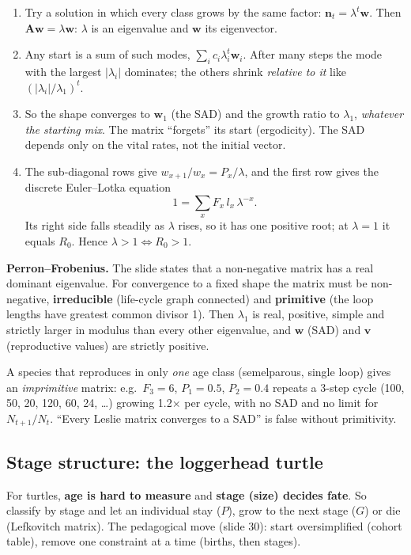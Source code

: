 \begin{chain}
\begin{enumerate}
\item Try a solution in which every class grows by the same factor: $\mathbf n_t=\lambda^t\mathbf w$. Then
$\mathbf A\mathbf w=\lambda\mathbf w$: $\lambda$ is an eigenvalue and $\mathbf w$ its eigenvector.
\item Any start is a sum of such modes, $\sum_i c_i\lambda_i^t\mathbf w_i$. After many steps the mode with the
largest $|\lambda_i|$ dominates; the others shrink \emph{relative to it} like $(|\lambda_i|/\lambda_1)^t$.
\item So the shape converges to $\mathbf w_1$ (the SAD) and the growth ratio to $\lambda_1$, \emph{whatever the
starting mix}. The matrix ``forgets'' its start (ergodicity). The SAD depends only on the vital rates, not the initial
vector.
\item The sub-diagonal rows give $w_{x+1}/w_x=P_x/\lambda$, and the first row gives the discrete Euler--Lotka equation
\[
1=\sum_x F_x\,l_x\,\lambda^{-x}.
\]
Its right side falls steadily as $\lambda$ rises, so it has one positive root; at $\lambda=1$ it equals $R_0$. Hence
$\lambda>1\iff R_0>1$.
\end{enumerate}
\end{chain}

\textbf{Perron--Frobenius.} The slide states that a non-negative matrix has a real dominant eigenvalue. For
convergence to a fixed shape the matrix must be non-negative, \textbf{irreducible} (life-cycle graph connected) and
\textbf{primitive} (the loop lengths have greatest common divisor 1). Then $\lambda_1$ is real, positive, simple and
strictly larger in modulus than every other eigenvalue, and $\mathbf w$ (SAD) and $\mathbf v$ (reproductive values)
are strictly positive.

\begin{trap}
A species that reproduces in only \emph{one} age class (semelparous, single loop) gives an \emph{imprimitive} matrix:
e.g.\ $F_3=6$, $P_1=0.5$, $P_2=0.4$ repeats a 3-step cycle (100, 50, 20, 120, 60, 24, \dots) growing 1.2$\times$
per cycle, with no SAD and no limit for $N_{t+1}/N_t$. ``Every Leslie matrix converges to a SAD'' is false without
primitivity.
\end{trap}

\subsection{Stage structure: the loggerhead turtle}
For turtles, \textbf{age is hard to measure} and \textbf{stage (size) decides fate}. So classify by stage and let an
individual stay ($P$), grow to the next stage ($G$) or die (Lefkovitch matrix). The pedagogical move (slide 30):
start oversimplified (cohort table), remove one constraint at a time (births, then stages).

